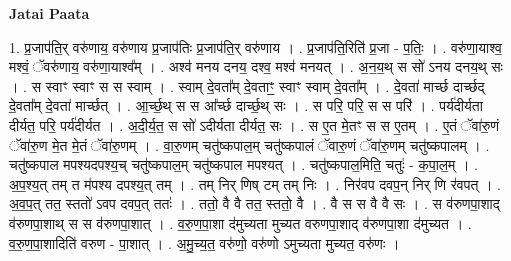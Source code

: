 \documentclass[17pt]{extarticle}
\begin{document}
\textbf{Jatai Paata} \newline

1. प्र॒जाप॑ति॒र् वरु॑णाय॒ वरु॑णाय प्र॒जाप॑तिः प्र॒जाप॑ति॒र् वरु॑णाय । . प्र॒जाप॑ति॒रिति॑ प्र॒जा - प॒तिः॒ । . वरु॑णा॒याश्व॒ मश्वं॒ ॅवरु॑णाय॒ वरु॑णा॒याश्व᳚म् । . अश्व॑ मनय दनय॒ दश्व॒ मश्व॑ मनयत् । . अ॒न॒य॒थ् स सो॑ ऽनय दनय॒थ् सः । . स स्वाꣳ स्वाꣳ स स स्वाम् । . स्वाम् दे॒वता᳚म् दे॒वताꣳ॒॒ स्वाꣳ स्वाम् दे॒वता᳚म् । . दे॒वता॑ मार्च्छ दार्च्छद् दे॒वता᳚म् दे॒वता॑ मार्च्छत् । . आ॒र्च्छ॒थ् स स आ᳚र्च्छ दार्च्छ॒थ् सः । . स परि॒ परि॒ स स परि॑ । . पर्य॑दीर्यता दीर्यत॒ परि॒ पर्य॑दीर्यत । . अ॒दी॒र्य॒त॒ स सो॑ ऽदीर्यता दीर्यत॒ सः । . स ए॒त मे॒तꣳ स स ए॒तम् । . ए॒तं ॅवा॑रु॒णं ॅवा॑रु॒ण मे॒त मे॒तं ॅवा॑रु॒णम् । . वा॒रु॒णम् चतु॑ष्कपाल॒म् चतु॑ष्कपालं ॅवारु॒णं ॅवा॑रु॒णम् चतु॑ष्कपालम् । . चतु॑ष्कपाल मपश्यदपश्य॒च् चतु॑ष्कपाल॒म् चतु॑ष्कपाल मपश्यत् । . चतु॑ष्कपाल॒मिति॒ चतुः॑ - क॒पा॒ल॒म् । . अ॒प॒श्य॒त् तम् त म॑पश्य दपश्य॒त् तम् । . तम् निर् णिष् टम् तम् निः । . निर॑वप दवप॒न् निर् णि र॑वपत् । . अ॒व॒प॒त् तत॒ स्ततो॑ ऽवप दवप॒त् ततः॑ । . ततो॒ वै वै तत॒ स्ततो॒ वै । . वै स स वै वै सः । . स व॑रुणपा॒शाद् व॑रुणपा॒शाथ् स स व॑रुणपा॒शात् । . व॒रु॒ण॒पा॒शा द॑मुच्यता मुच्यत वरुणपा॒शाद् व॑रुणपा॒शा द॑मुच्यत । . व॒रु॒ण॒पा॒शादिति॑ वरुण - पा॒शात् । . अ॒मु॒च्य॒त॒ वरु॑णो॒ वरु॑णो ऽमुच्यता मुच्यत॒ वरु॑णः । \newline
\end{document}
